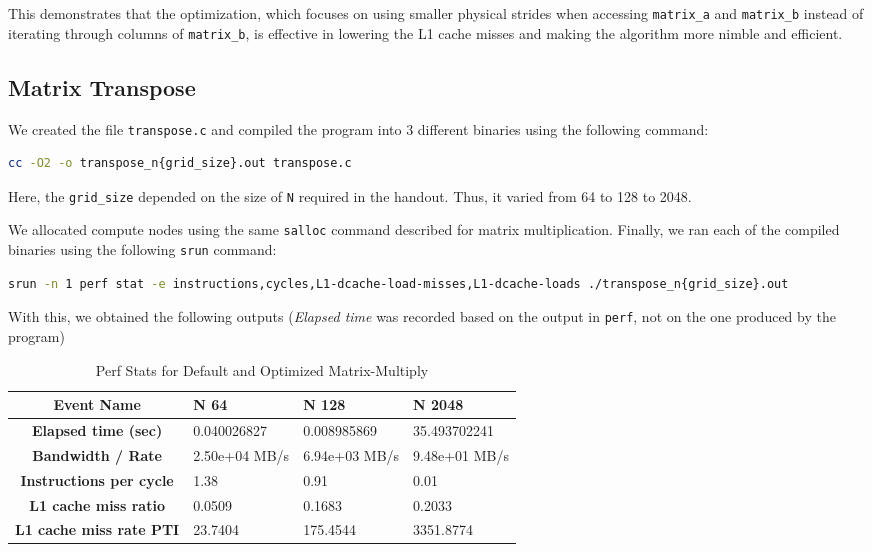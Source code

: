 \documentclass[a4paper,10pt]{article}
\begin{document}
This demonstrates that the optimization, which focuses on using smaller physical strides when accessing \verb|matrix_a| and \verb|matrix_b| instead of iterating through columns of \verb|matrix_b|, is effective in lowering the L1 cache misses and making the algorithm more nimble and efficient. 

\subsection{Matrix Transpose}
\label{sec:matrix_transpose}
We created the file \verb|transpose.c| and compiled the program into 3 different binaries using the following command: 
\begin{lstlisting}[language=bash,basicstyle=\ttfamily]
cc -O2 -o transpose_n{grid_size}.out transpose.c
\end{lstlisting}
Here, the \verb|grid_size| depended on the size of \verb|N| required in the handout. Thus, it varied from 64 to 128 to 2048. 

We allocated compute nodes using the same \verb|salloc| command described for matrix multiplication. Finally, we ran each of the compiled binaries using the following \verb|srun| command: 
\begin{lstlisting}[language=bash,basicstyle=\tiny\ttfamily]
srun -n 1 perf stat -e instructions,cycles,L1-dcache-load-misses,L1-dcache-loads ./transpose_n{grid_size}.out
\end{lstlisting}
With this, we obtained the following outputs (\textit{Elapsed time} was recorded based on the output in \verb|perf|, not on the one produced by the program)
\begin{table}[h!]
\centering
\begin{tabular}{|c|p{2.5cm}|p{2.5cm}|p{2.5cm}|}
\hline
\textbf{Event Name} & \textbf{N 64} & \textbf{N 128} & \textbf{N 2048}  \\
\hline
\textbf{Elapsed time (sec)} & 0.040026827 & 0.008985869 & 35.493702241  \\
\hline
\textbf{Bandwidth / Rate} & 2.50e+04 MB/s & 6.94e+03 MB/s & 9.48e+01 MB/s \\
\hline
\textbf{Instructions per cycle} & 1.38 & 0.91 & 0.01 \\ 
\hline
\textbf{L1 cache miss ratio} & 0.0509 & 0.1683 & 0.2033 \\
\hline
\textbf{L1 cache miss rate PTI} & 23.7404 & 175.4544 & 3351.8774  \\
\hline
\end{tabular}
\caption{Perf Stats for Default and Optimized Matrix-Multiply}
\end{table}
\end{document}
